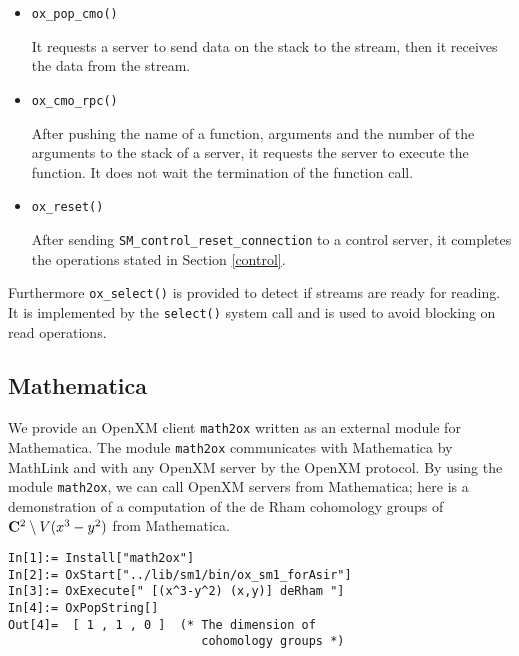 \begin{itemize}
\item {\tt ox\_pop\_cmo()}

It requests a server to send data on the stack to the stream, then
it receives the data from the stream.

\item {\tt ox\_cmo\_rpc()}

After pushing the name of a function, arguments and the number of the
arguments to the stack of a server, it requests the server to execute
the function. It does not wait the termination of the function call.

\item {\tt ox\_reset()}

After sending {\tt SM\_control\_reset\_connection} to a control server,
it completes the operations stated in Section \ref{control}.
\end{itemize}
Furthermore {\tt ox\_select()} is provided to detect if streams are ready for
reading. It is implemented by the {\tt select()} system call and is used
to avoid blocking on read operations.

\subsection{Mathematica}

We provide an OpenXM client {\tt math2ox} written as an external module
for Mathematica.  
The module {\tt math2ox} communicates with Mathematica by MathLink and
with any OpenXM server by the OpenXM protocol.  
By using the module {\tt math2ox},
we can call OpenXM servers from Mathematica;
here is a demonstration of a computation of the de Rham cohomology groups
of ${\bf C}^2 \setminus V(x^3-y^2)$ from Mathematica.
{\footnotesize
\begin{verbatim}
In[1]:= Install["math2ox"]
In[2]:= OxStart["../lib/sm1/bin/ox_sm1_forAsir"]
In[3]:= OxExecute[" [(x^3-y^2) (x,y)] deRham "]
In[4]:= OxPopString[]
Out[4]=  [ 1 , 1 , 0 ]  (* The dimension of 
                           cohomology groups *)
\end{verbatim}
}

